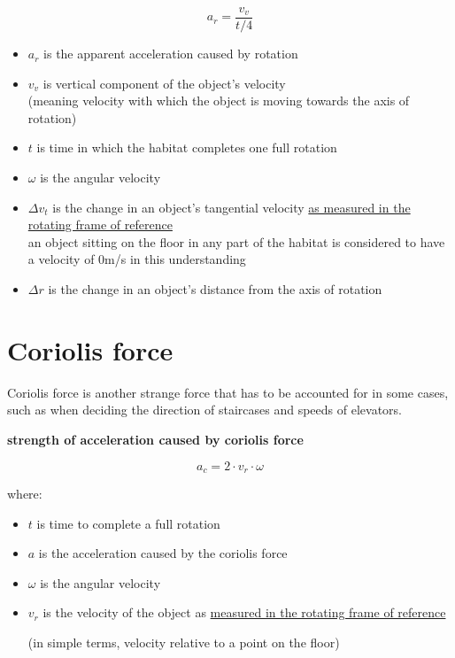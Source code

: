 \documentclass[a4paper]{article}
\begin{document}
	$$ a_r = \frac{v_v}{t/4} $$
	
	\begin{itemize}
		\item $a_r$ is the apparent acceleration caused by rotation
		
		\item $v_v$ is vertical component of the object's velocity\\(meaning velocity with which the object is moving towards the axis of rotation)
		
		\item $t$ is time in which the habitat completes one full rotation
		
		\item $\omega$ is the angular velocity
		
		\item $\Delta v_t$ is the change in an object's tangential velocity \underline{as measured in the rotating frame of reference}\\an object sitting on the floor in any part of the habitat is considered to have a velocity of 0m/s in this understanding
		
		\item $\Delta r$ is the change in an object's distance from the axis of rotation
	\end{itemize}
	
	\pagebreak
	\fi
	
	\iffalse
	
	\section{Coriolis force}
	
	Coriolis force is another strange force that has to be accounted for in some cases, such as when deciding the direction of staircases and speeds of elevators.
	
	\begin{center}
		\textbf{strength of acceleration caused by coriolis force}
	\end{center}
	
	$$ a_c = 2 \cdot v_r \cdot \omega $$
	
	where:
	
	\begin{itemize}
		\item $t$ is time to complete a full rotation
		
		\item $a$ is the acceleration caused by the coriolis force
		
		\item $\omega$ is the angular velocity
		
		\item $v_r$ is the velocity of the object as \underline{measured in the rotating frame of reference}
		
		(in simple terms, velocity relative to a point on the floor)
	\end{itemize}
	
\end{document}
